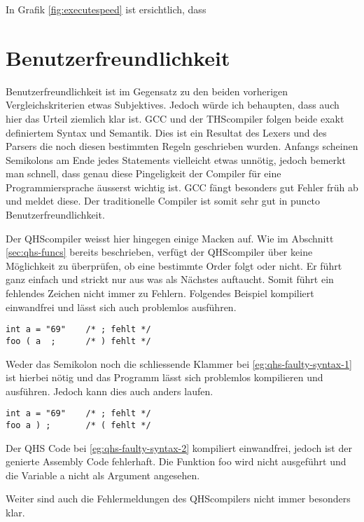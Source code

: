 In Grafik \ref{fig:executespeed} ist ersichtlich, dass 


\section{Benutzerfreundlichkeit}
Benutzerfreundlichkeit ist im Gegensatz zu den beiden vorherigen Vergleichskriterien etwas Subjektives. Jedoch würde ich behaupten, dass auch hier das Urteil ziemlich klar ist.
GCC und der THScompiler folgen beide exakt definiertem Syntax und Semantik. Dies ist ein Resultat des Lexers und des Parsers die noch diesen bestimmten Regeln geschrieben wurden.
Anfangs scheinen Semikolons am Ende jedes Statements vielleicht etwas unnötig, jedoch bemerkt man schnell, dass genau diese Pingeligkeit der Compiler für eine Programmiersprache äusserst wichtig ist.
GCC fängt besonders gut Fehler früh ab und meldet diese. Der traditionelle Compiler ist somit sehr gut in puncto Benutzerfreundlichkeit.

Der QHScompiler weisst hier hingegen einige Macken auf. Wie im Abschnitt \ref{sec:qhs-funcs} bereits beschrieben, verfügt der QHScompiler über keine Möglichkeit zu überprüfen, ob eine bestimmte Order folgt oder nicht.
Er führt ganz einfach und strickt nur aus was als Nächstes auftaucht. Somit führt ein fehlendes Zeichen nicht immer zu Fehlern. Folgendes Beispiel kompiliert einwandfrei und lässt sich auch problemlos ausführen.

\begin{lstlisting}[language=QHS, caption=QHS mit fehlenden Tokens, label=eg:qhs-faulty-syntax-1]
int a = "69"    /* ; fehlt */
foo ( a  ;      /* ) fehlt */
\end{lstlisting}

Weder das Semikolon noch die schliessende Klammer bei \ref{eg:qhs-faulty-syntax-1} ist hierbei nötig und das Programm lässt sich problemlos kompilieren und ausführen. Jedoch kann dies auch anders laufen.

\begin{lstlisting}[language=QHS, caption=QHS mit fehlender (, label=eg:qhs-faulty-syntax-2]
int a = "69"    /* ; fehlt */
foo a ) ;       /* ( fehlt */
\end{lstlisting}

Der QHS Code bei \ref{eg:qhs-faulty-syntax-2} kompiliert einwandfrei, jedoch ist der genierte Assembly Code fehlerhaft. Die Funktion foo wird nicht ausgeführt und die Variable a nicht als Argument angesehen.

Weiter sind auch die Fehlermeldungen des QHScompilers nicht immer besonders klar.

